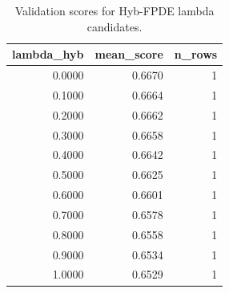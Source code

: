 \begin{table}[t]
\caption{Validation scores for Hyb-FPDE lambda candidates.}
\label{tab:lambda_distribution_computed}
\centering
\begin{tabular}{rrr}
\toprule
lambda\_hyb & mean\_score & n\_rows \\
\midrule
0.0000 & 0.6670 & 1 \\
0.1000 & 0.6664 & 1 \\
0.2000 & 0.6662 & 1 \\
0.3000 & 0.6658 & 1 \\
0.4000 & 0.6642 & 1 \\
0.5000 & 0.6625 & 1 \\
0.6000 & 0.6601 & 1 \\
0.7000 & 0.6578 & 1 \\
0.8000 & 0.6558 & 1 \\
0.9000 & 0.6534 & 1 \\
1.0000 & 0.6529 & 1 \\
\bottomrule
\end{tabular}

\end{table}
